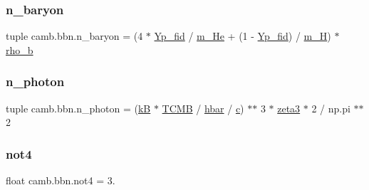 \subsubsection{\texorpdfstring{n\+\_\+baryon}{n\_baryon}}
{\footnotesize\ttfamily tuple camb.\+bbn.\+n\+\_\+baryon = (4 $\ast$ \mbox{\hyperlink{namespacecamb_1_1bbn_ace4721f676cd3090adcf649ff5eb439d}{Yp\+\_\+fid}} / \mbox{\hyperlink{namespacecamb_1_1bbn_addcae6f33c5419e66f9ae3006383c347}{m\+\_\+\+He}} + (1 -\/ \mbox{\hyperlink{namespacecamb_1_1bbn_ace4721f676cd3090adcf649ff5eb439d}{Yp\+\_\+fid}}) / \mbox{\hyperlink{namespacecamb_1_1bbn_aa3780f95e3d1ace78bfe399ae081a621}{m\+\_\+H}}) $\ast$ \mbox{\hyperlink{namespacecamb_1_1bbn_ab5c5cbf9f645a4f423e0b8fdaba3c869}{rho\+\_\+b}}}

\mbox{\label{namespacecamb_1_1bbn_aa1b409ea1a7b5f583772b3f5cc174be0}} 
\subsubsection{\texorpdfstring{n\+\_\+photon}{n\_photon}}
{\footnotesize\ttfamily tuple camb.\+bbn.\+n\+\_\+photon = (\mbox{\hyperlink{namespacecamb_1_1bbn_acf1e58cf8bb0a963cdea5d6d5c8a7965}{kB}} $\ast$ \mbox{\hyperlink{namespacecamb_1_1bbn_ada23f3dc20ced1c849a9c6885f34db92}{T\+C\+MB}} / \mbox{\hyperlink{namespacecamb_1_1bbn_a5b708814b666163b312ae9d46c458a40}{hbar}} / \mbox{\hyperlink{namespacecamb_1_1bbn_a679cc6941c03606fb81846de0595bbf0}{c}}) $\ast$$\ast$ 3 $\ast$ \mbox{\hyperlink{namespacecamb_1_1bbn_a484a30a2544ce82886fb2fe6860cc65c}{zeta3}} $\ast$ 2 / np.\+pi $\ast$$\ast$ 2}

\mbox{\label{namespacecamb_1_1bbn_a55010dc4504208bd6bf60957271700c4}} 
\subsubsection{\texorpdfstring{not4}{not4}}
{\footnotesize\ttfamily float camb.\+bbn.\+not4 = 3.}

\mbox{\label{namespacecamb_1_1bbn_ac4e809a6c935e14eddb8e95f83b83c00}} 
